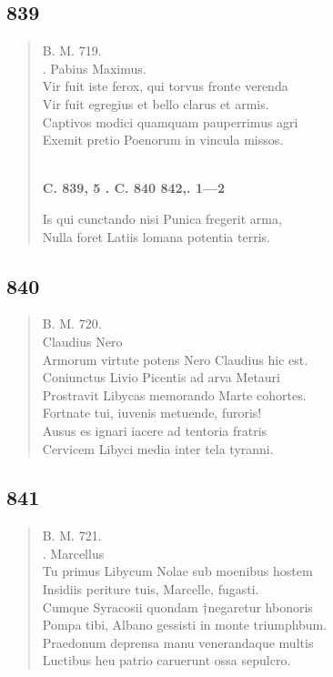 \documentclass[11pt, a4paper]{report}
\begin{document}
            \subsection*{839}
      \begin{verse}
      B. M. 719. \\ . Pabius Maximus. \\ Vir fuit iste ferox, qui torvus fronte verenda \\ Vir fuit egregius et bello clarus et armis. \\ Captivos modici quamquam pauperrimus agri \\ Exemit pretio Poenorum in vincula missos. \\ 
        ﻿\pagebreak 
     \marginpar{[304]} \begin{center} \textbf{C. 839, 5 . C. 840 842,. 1—2} \end{center}Is qui cunctando nisi Punica fregerit arma, \\ Nulla foret Latiis lomana potentia terris. \\ 
      \end{verse}
  
            \subsection*{840}
      \begin{verse}
      B. M. 720. \\ Claudius Nero \\ Armorum virtute potens Nero Claudius hic est. \\ Coniunctus Livio Picentis ad arva Metauri \\ Prostravit Libycas memorando Marte cohortes. \\ Fortnate tui, iuvenis metuende, furoris! \\ Ausus es ignari iacere ad tentoria fratris \\ Cervicem Libyci media inter tela tyranni. \\ 
      \end{verse}
  
            \subsection*{841}
      \begin{verse}
      B. M. 721. \\ . Marcellus \\ Tu primus Libycum Nolae sub moenibus hostem \\ Insidiis periture tuis, Marcelle, fugasti. \\ Cumque Syracosii quondam †negaretur hbonoris \\ Pompa tibi, Albano gessisti in monte triumphbum. \\ Praedonum deprensa manu venerandaque multis \\ Luctibus heu patrio caruerunt ossa sepulcro. \\ 
      \end{verse}
  
\end{document}
